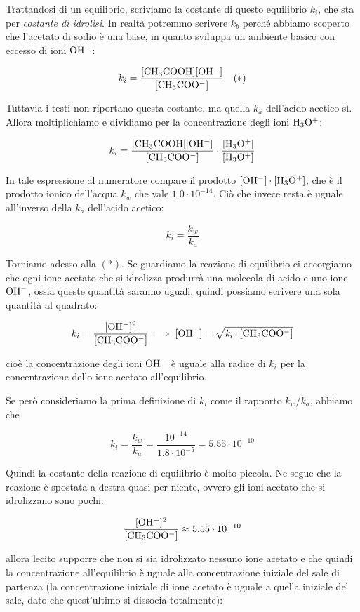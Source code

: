 Trattandosi di un equilibrio, scriviamo la costante di questo equilibrio $k_i$, che sta per \textit{costante di idrolisi}. In realtà potremmo scrivere $k_b$ perché abbiamo scoperto che l'acetato di sodio è una base, in quanto sviluppa un ambiente basico con eccesso di ioni $\rm OH^-$:

$$k_i = \rm{\frac{[CH_3COOH] [OH^-]}{[CH_3COO^-]}} \quad (*)$$

Tuttavia i testi non riportano questa costante, ma quella $k_a$ dell'acido acetico sì. Allora moltiplichiamo e dividiamo per la concentrazione degli ioni $\rm H_3O^+$:

$$k_i = \rm{\frac{[CH_3COOH] [OH^-]}{[CH_3COO^-]} \cdot \frac{[H_3O^+]}{[H_3O^+]}}$$

In tale espressione al numeratore compare il prodotto $\rm [OH^-] \cdot [H_3O^+]$, che è il prodotto ionico dell'acqua $k_w$ che vale $1.0 \cdot 10^{-14}$. Ciò che invece resta è uguale all'inverso della $k_a$ dell'acido acetico:

$$k_i = \frac{k_w}{k_a}$$

Torniamo adesso alla $(*)$. Se guardiamo la reazione di equilibrio ci accorgiamo che ogni ione acetato che si idrolizza produrrà una molecola di acido e uno ione $\rm OH^-$, ossia queste quantità saranno uguali, quindi possiamo scrivere una sola quantità al quadrato:

$$k_i = \rm{\frac{[OH^-]^2}{[CH_3COO^-]}} \implies [OH^-]= \sqrt{\textit{k}_\textit{i} \cdot [CH_3COO^-]}$$

cioè la concentrazione degli ioni $\rm OH^-$ è uguale alla radice di $k_i$ per la concentrazione dello ione acetato all'equilibrio.

Se però consideriamo la prima definizione di $k_i$ come il rapporto $k_w/k_a$, abbiamo che

$$k_i = \frac{k_w}{k_a} = \frac{10^{-14}}{1.8 \cdot 10^{-5}}=5.55 \cdot 10^{-10}$$

Quindi la costante della reazione di equilibrio è molto piccola. Ne segue che la reazione è spostata a destra quasi per niente, ovvero gli ioni acetato che si idrolizzano sono pochi:

$$\rm{\frac{[OH^-]^2}{[CH_3COO^-]}} \approx 5.55 \cdot 10^{-10}$$

\E allora lecito supporre che non si sia idrolizzato nessuno ione acetato e che quindi la concentrazione all'equilibrio è uguale alla concentrazione iniziale del sale di partenza (la concentrazione iniziale di ione acetato è uguale a quella iniziale del sale, dato che quest'ultimo si dissocia totalmente):

